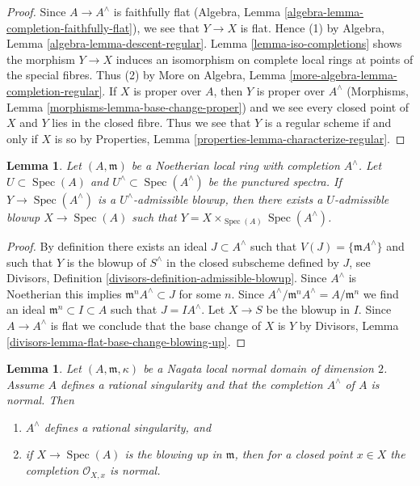 \documentclass{stacks-project}
\theoremstyle{plain}
\newtheorem{lemma}[subsection]{Lemma}
\theoremstyle{definition}
\theoremstyle{remark}
\numberwithin{equation}{subsection}
\def\Spec{\mathop{\mathrm{Spec}}}
\begin{document}
\begin{proof}
Since $A \to A^\wedge$ is faithfully flat
(Algebra, Lemma \ref{algebra-lemma-completion-faithfully-flat}),
we see that $Y \to X$ is flat. Hence (1) by
Algebra, Lemma \ref{algebra-lemma-descent-regular}.
Lemma \ref{lemma-iso-completions} shows the morphism $Y \to X$
induces an isomorphism on complete local rings at points
of the special fibres. Thus (2) by
More on Algebra, Lemma \ref{more-algebra-lemma-completion-regular}.
If $X$ is proper over $A$, then $Y$ is proper over $A^\wedge$
(Morphisms, Lemma \ref{morphisms-lemma-base-change-proper})
and we see every closed point of $X$ and $Y$ lies in the closed fibre.
Thus we see that $Y$ is a regular scheme if and only if $X$ is so by
Properties, Lemma \ref{properties-lemma-characterize-regular}.
\end{proof}

\begin{lemma}
\label{lemma-descend-admissible-blowup}
Let $(A, \mathfrak m)$ be a Noetherian local ring with completion $A^\wedge$.
Let $U \subset \Spec(A)$ and $U^\wedge \subset \Spec(A^\wedge)$ be the
punctured spectra. If $Y \to \Spec(A^\wedge)$ is a $U^\wedge$-admissible
blowup, then there exists a $U$-admissible blowup $X \to \Spec(A)$
such that $Y = X \times_{\Spec(A)} \Spec(A^\wedge)$.
\end{lemma}

\begin{proof}
By definition there exists an ideal $J \subset A^\wedge$ such that
$V(J) = \{\mathfrak m A^\wedge\}$ and such that $Y$ is the blowup
of $S^\wedge$ in the closed subscheme defined by $J$, see
Divisors, Definition \ref{divisors-definition-admissible-blowup}.
Since $A^\wedge$ is Noetherian this implies
$\mathfrak m^n A^\wedge \subset J$ for some $n$.
Since $A^\wedge/\mathfrak m^n A^\wedge = A/\mathfrak m^n$
we find an ideal $\mathfrak m^n \subset I \subset A$
such that $J = I A^\wedge$. Let $X \to S$ be the blowup in $I$.
Since $A \to A^\wedge$ is flat
we conclude that the base change of $X$ is $Y$ by
Divisors, Lemma \ref{divisors-lemma-flat-base-change-blowing-up}.
\end{proof}

\begin{lemma}
\label{lemma-blowup-still-good}
Let $(A, \mathfrak m, \kappa)$ be a Nagata local normal domain of
dimension $2$. Assume $A$ defines a rational singularity and that
the completion $A^\wedge$ of $A$ is normal. Then
\begin{enumerate}
\item $A^\wedge$ defines a rational singularity, and
\item if $X \to \Spec(A)$ is the blowing up in $\mathfrak m$, then
for a closed point $x \in X$ the completion $\mathcal{O}_{X, x}$ is normal.
\end{enumerate}
\end{lemma}
\end{document}
